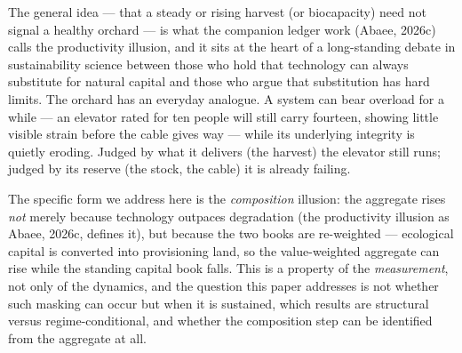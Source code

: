 \documentclass[11pt]{article}
\begin{document}
The general idea --- that a steady or rising harvest (or biocapacity) need not signal a healthy orchard --- is what the companion ledger work (Abaee, 2026c) calls the productivity illusion, and it sits at the heart of a long-standing debate in sustainability science between those who hold that technology can always substitute for natural capital and those who argue that substitution has hard limits. The orchard has an everyday analogue. A system can bear overload for a while --- an elevator rated for ten people will still carry fourteen, showing little visible strain before the cable gives way --- while its underlying integrity is quietly eroding. Judged by what it delivers (the harvest) the elevator still runs; judged by its reserve (the stock, the cable) it is already failing.

The specific form we address here is the \emph{composition} illusion: the aggregate rises \emph{not} merely because technology outpaces degradation (the productivity illusion as Abaee, 2026c, defines it), but because the two books are re-weighted --- ecological capital is converted into provisioning land, so the value-weighted aggregate can rise while the standing capital book falls. This is a property of the \emph{measurement}, not only of the dynamics, and the question this paper addresses is not whether such masking can occur but when it is sustained, which results are structural versus regime-conditional, and whether the composition step can be identified from the aggregate at all.
\end{document}
